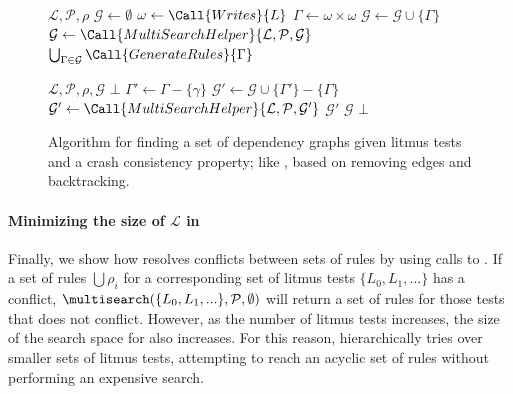 \begin{figure}[h]
\begin{algorithmic}[1]
    {$\mathcal{L}, \mathcal{P}, \rho$} 
    \State $\mathcal{G} \gets \emptyset$
      \State $\omega \gets \Call{Writes}{L}$
      \State $\Gamma \gets \omega \times \omega$
      \State $\mathcal{G} \gets \mathcal{G} \cup \{\Gamma\}$
    \EndFor
    \State $\mathcal{G} \gets \Call{MultiSearchHelper}{\mathcal{L},\mathcal{P},\mathcal{G}}$
    \State \Return $\bigcup_{\Gamma\in\mathcal{G}} \Call{GenerateRules}{\Gamma}$
  \EndFunction

    {$\mathcal{L}, \mathcal{P}, \rho, \mathcal{G}$}
      \State \Return $\bot$
    \EndIf
      \For{$\gamma\in\Gamma$}
        \State $\Gamma' \gets \Gamma - \{\gamma\}$
        \State $\mathcal{G}' \gets \mathcal{G} \cup \{\Gamma'\} - \{\Gamma\}$
        \State $\mathcal{G}' \gets \Call{MultiSearchHelper}{\mathcal{L}, \mathcal{P}, \mathcal{G}'}$
          \State \Return $\mathcal{G}'$
        \EndIf
      \EndFor
    \EndFor
      \State \Return $\mathcal{G}$
    \EndIf
    \State \Return $\bot$
  \EndFunction
\end{algorithmic}
\caption{Algorithm for finding a set of dependency graphs given litmus tests and a crash consistency
property; like \graphsearch, based on removing edges and backtracking.\tighten}
\label{alg:multi-search}
\end{figure}

\paragraph{Minimizing the size of $\mathcal{L}$ in \multisearch}
Finally, we show how \depsynth resolves conflicts between sets of rules by using
calls to \multisearch.
If a set of rules $\bigcup \rho_i$ for a corresponding set of litmus tests $\{L_0, L_1, ...\}$ has
a conflict, $\multisearch(\{L_0, L_1, ...\}, \mathcal{P}, \emptyset)$ will return a set of rules
for those tests that does not conflict. However, as the number of litmus tests increases, the
size of the search space for \multisearch also increases. For this reason, \depsynth hierarchically
tries \multisearch over smaller sets of litmus tests, attempting to reach an acyclic set
of rules without performing an expensive search.

